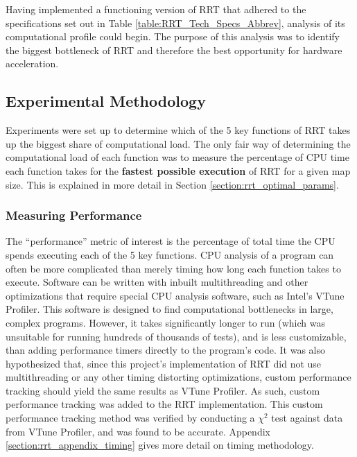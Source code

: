 
Having implemented a functioning version of \gls{RRT} that adhered to the specifications set out in Table \ref{table:RRT_Tech_Specs_Abbrev}, analysis of its computational profile could begin. The purpose of this analysis was to identify the biggest bottleneck of \gls{RRT} and therefore the best opportunity for hardware acceleration.

\subsection{Experimental Methodology}
    Experiments were set up to determine which of the 5 key functions of \gls{RRT} takes up the biggest share of computational load. The only fair way of determining the computational load of each function was to measure the percentage of \gls{CPU} time each function takes for the \textbf{fastest possible execution} of \gls{RRT} for a given map size. This is explained in more detail in Section \ref{section:rrt_optimal_params}.

    \subsubsection{Measuring Performance}
        The ``performance'' metric of interest is the percentage of total time the \gls{CPU} spends executing each of the 5 key functions. CPU analysis of a program can often be more complicated than merely timing how long each function takes to execute. Software can be written with inbuilt multithreading and other optimizations that require special CPU analysis software, such as Intel's VTune Profiler\cite{Intel2019}. This software is designed to find computational bottlenecks in large, complex programs. However, it takes significantly longer to run (which was unsuitable for running hundreds of thousands of tests), and is less customizable, than adding performance timers directly to the program's code. It was also hypothesized that, since this project's implementation of \gls{RRT} did not use multithreading or any other timing distorting optimizations, custom performance tracking should yield the same results as VTune Profiler. As such, custom performance tracking was added to the \gls{RRT} implementation. This custom performance tracking method was verified by conducting a $\chi^2$ test against data from VTune Profiler, and was found to be accurate. Appendix \ref{section:rrt_appendix_timing} gives more detail on timing methodology.

